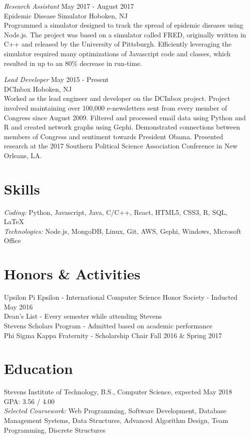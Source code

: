 \documentclass{res}
\begin{document}
{{\sl Research Assistant} \hfill May 2017 - August 2017\\
Epidemic Disease Simulator \hfill Hoboken, NJ \\
Programmed a simulator designed to track the spread of epidemic diseases using Node.js. The project was based on a simulator called FRED, originally  written in C++ and released by the University of Pittsburgh. Efficiently leveraging the simulator required many optimizations of Javascript code and classes, which resulted in up to an 80\% decrease in run-time.

{\sl Lead Developer} \hfill May 2015 - Present \\
DCInbox \hfill Hoboken, NJ \\
Worked as the lead engineer and developer on the DCInbox project. Project involved maintaining over 100,000 e-newsletters sent from every member of Congress since August 2009. Filtered and processed email data using Python and R and created network graphs using Gephi. Demonstrated connections between members of Congress and sentiment towards President Obama. Presented research at the 2017 Southern Political Science Association Conference in New Orleans, LA.


\section{\bf\large Skills}
{\sl Coding: } Python, Javascript, Java, C/C++, React, HTML5, CSS3, R, SQL, LaTeX \\
{\sl Technologies:} Node.js, MongoDB, Linux, Git, AWS, Gephi, Windows, Microsoft Office

\section{\bf\large Honors \& Activities}
Upsilon Pi Epsilon - International Computer Science Honor Society - Inducted May 2016\\
Dean's List - Every semester while attending Stevens \\
Stevens Scholars Program - Admitted based on academic performance \\ %
Phi Sigma Kappa Fraternity - Scholarship Chair Fall 2016 \& Spring 2017

\section{\bf\large Education}
Stevens Institute of Technology, B.S., Computer Science, expected May 2018 \hfill GPA: 3.56 / 4.00 \\
{\sl Selected Coursework:} Web Programming, Software Development, Database Management Systems, Data Structures, Advanced Algorithm Design, Team Programming, Discrete Structures

}
\end{document}
